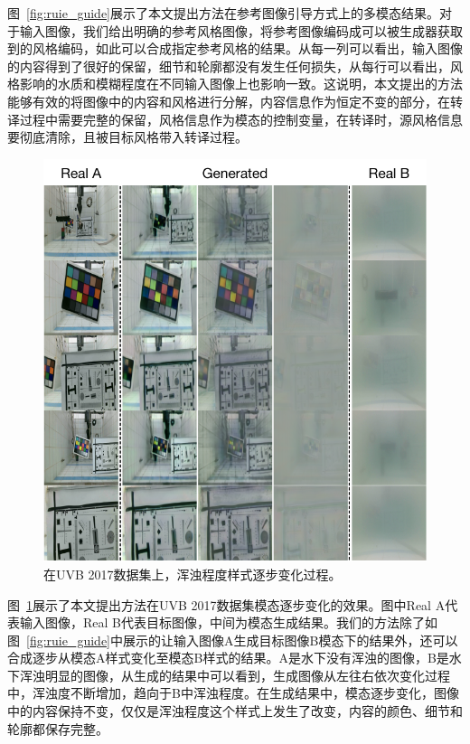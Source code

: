 图~\ref{fig:ruie_guide}展示了本文提出方法在参考图像引导方式上的多模态结果。对于输入图像，我们给出明确的参考风格图像，将参考图像编码成可以被生成器获取到的风格编码，如此可以合成指定参考风格的结果。从每一列可以看出，输入图像的内容得到了很好的保留，细节和轮廓都没有发生任何损失，从每行可以看出，风格影响的水质和模糊程度在不同输入图像上也影响一致。这说明，本文提出的方法能够有效的将图像中的内容和风格进行分解，内容信息作为恒定不变的部分，在转译过程中需要完整的保留，风格信息作为模态的控制变量，在转译时，源风格信息要彻底清除，且被目标风格带入转译过程。

\begin{figure}[ht]
    \centering
	\includegraphics[width=\textwidth]{figures/UVB-change.pdf}
	\caption{在UVB 2017数据集上，浑浊程度样式逐步变化过程。}
	\label{fig:uvb-change}
\end{figure}

图~\ref{fig:uvb-change}展示了本文提出方法在UVB 2017数据集模态逐步变化的效果。图中Real A代表输入图像，Real B代表目标图像，中间为模态生成结果。我们的方法除了如图~\ref{fig:ruie_guide}中展示的让输入图像A生成目标图像B模态下的结果外，还可以合成逐步从模态A样式变化至模态B样式的结果。A是水下没有浑浊的图像，B是水下浑浊明显的图像，从生成的结果中可以看到，生成图像从左往右依次变化过程中，浑浊度不断增加，趋向于B中浑浊程度。在生成结果中，模态逐步变化，图像中的内容保持不变，仅仅是浑浊程度这个样式上发生了改变，内容的颜色、细节和轮廓都保存完整。


